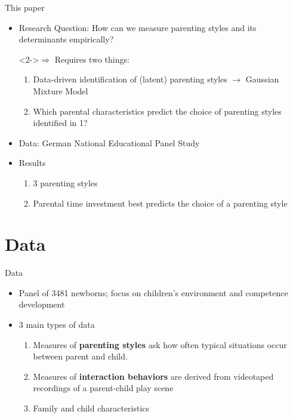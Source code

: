 \documentclass[notes, 12.5pt, aspectratio=169]{beamer}
\begin{document}
%
\begin{frame}{This paper}
	\begin{itemize}[(I)]
		\item<1-> Research Question: How can we measure parenting styles and its determinants empirically?
		\item[]<2->$\Longrightarrow$ Requires two things:
		\begin{enumerate}
			\item<3-> Data-driven identification of (latent) parenting styles $\rightarrow$ Gaussian Mixture Model \parencite{hastieElementsStatisticalLearning2009}
			\item<4-> Which parental characteristics predict the choice of parenting styles identified in 1?
		\end{enumerate}
		\item<5-> Data: German National Educational Panel Study \parencite{nepsnationaleducationalpanelstudybamberggermanyNEPSStartingCohort2021}
		\item<6-> Results
		\begin{enumerate}
			\item<6-> 3 parenting styles 
			\item<7-> Parental time investment best predicts the choice of a parenting style
		\end{enumerate}
	\end{itemize}
\end{frame}

\section{Data}
\begin{frame}{Data}
	\begin{itemize}[(I)]
		\item<1-> Panel of 3481 newborns; focus on children's environment and competence development
		\item<2-> 3 main types of data
		\begin{enumerate}
			\item<3-> Measures of \textbf{parenting styles} ask how often typical situations occur between parent and child.
			\item<4-> Measures of \textbf{interaction behaviors} are derived from videotaped recordings of a parent-child play scene
			\item<5-> Family and child characteristics
		\end{enumerate}
	\end{itemize}
\end{frame}
\end{document}
